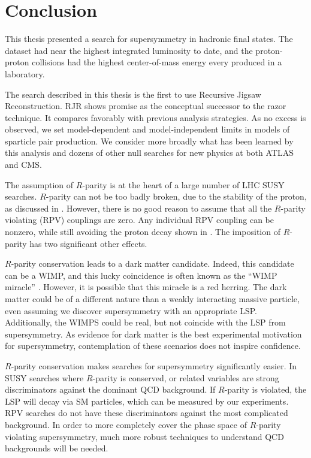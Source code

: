 
\chapter[Conclusion][Conclusion]{Conclusion} %

This thesis presented a search for supersymmetry in hadronic final states.
The dataset had near the highest integrated luminosity to date, and the proton-proton collisions had the highest center-of-mass energy every produced in a laboratory.

The search described in this thesis is the first to use Recursive Jigsaw Reconstruction.
RJR shows promise as the  conceptual successor to the razor technique.
It compares favorably with previous analysis strategies.
As no excess is observed, we set model-dependent and model-independent limits in models of sparticle pair production.
We consider more broadly what has been learned by this analysis and dozens of other null searches for new physics at both ATLAS and CMS.

The assumption of $R$-parity is at the heart of a large number of LHC SUSY searches.
$R$-parity can not be too badly broken, due to the stability of the proton, as discussed in .
However, there is no good reason to assume that all the $R$-parity violating (RPV) couplings are zero.
Any individual RPV coupling can be nonzero, while still avoiding the proton decay shown in .
The imposition of $R$-parity has two significant other effects.

$R$-parity conservation leads to a dark matter candidate.
Indeed, this candidate can be a WIMP, and this lucky coincidence is often known as the ``WIMP miracle'' \cite{darkMatterPrimer}.
However, it is possible that this miracle is a red herring.
The dark matter could be of a different nature than a weakly interacting massive particle, even assuming we discover supersymmetry with an appropriate LSP.
Additionally, the WIMPS could be real, but not coincide with the LSP from supersymmetry.
As evidence for dark matter is the best experimental motivation for supersymmetry, contemplation of these scenarios does not inspire confidence.

$R$-parity conservation makes searches for supersymmetry significantly easier.
In SUSY searches where $R$-parity is conserved, \met or related variables are strong discriminators against the dominant QCD background.
If $R$-parity is violated, the LSP will decay via SM particles, which can be measured by our experiments.
RPV searches do not have these discriminators against the most complicated background.
In order to more completely cover the phase space of $R$-parity violating supersymmetry, much more robust techniques to understand QCD backgrounds will be needed.

